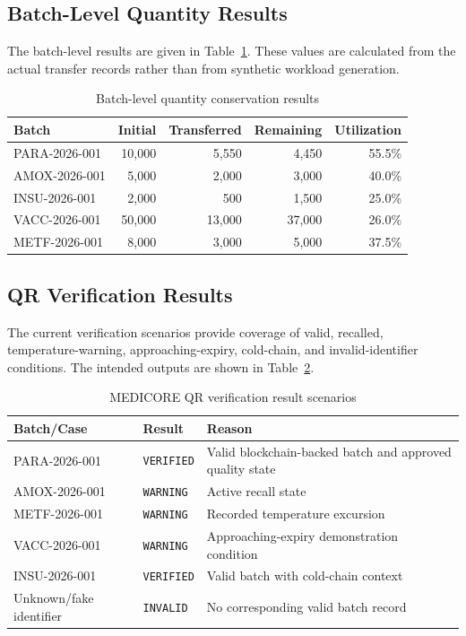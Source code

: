 \documentclass[11pt,a4paper]{article}
\begin{document}
\subsection{Batch-Level Quantity Results}
The batch-level results are given in Table~\ref{tab:batch_quantity_results}. These values are calculated from the actual transfer records rather than from synthetic workload generation.

\begin{table}[htbp]
\centering
\caption{Batch-level quantity conservation results}
\label{tab:batch_quantity_results}
\vspace{0.5em}
\begin{tabular}{lrrrr}
\toprule
\textbf{Batch} & \textbf{Initial} & \textbf{Transferred} & \textbf{Remaining} & \textbf{Utilization} \\
\midrule
PARA-2026-001 & 10,000 & 5,550 & 4,450 & 55.5\% \\
AMOX-2026-001 & 5,000 & 2,000 & 3,000 & 40.0\% \\
INSU-2026-001 & 2,000 & 500 & 1,500 & 25.0\% \\
VACC-2026-001 & 50,000 & 13,000 & 37,000 & 26.0\% \\
METF-2026-001 & 8,000 & 3,000 & 5,000 & 37.5\% \\
\bottomrule
\end{tabular}
\end{table}

\subsection{QR Verification Results}
The current verification scenarios provide coverage of valid, recalled, temperature-warning, approaching-expiry, cold-chain, and invalid-identifier conditions. The intended outputs are shown in Table~\ref{tab:qr_results}.

\begin{table}[htbp]
\centering
\caption{MEDICORE QR verification result scenarios}
\label{tab:qr_results}
\vspace{0.5em}
\begin{tabularx}{\textwidth}{lll}
\toprule
\textbf{Batch/Case} & \textbf{Result} & \textbf{Reason} \\
\midrule
PARA-2026-001 & \texttt{VERIFIED} & Valid blockchain-backed batch and approved quality state \\
AMOX-2026-001 & \texttt{WARNING} & Active recall state \\
METF-2026-001 & \texttt{WARNING} & Recorded temperature excursion \\
VACC-2026-001 & \texttt{WARNING} & Approaching-expiry demonstration condition \\
INSU-2026-001 & \texttt{VERIFIED} & Valid batch with cold-chain context \\
Unknown/fake identifier & \texttt{INVALID} & No corresponding valid batch record \\
\bottomrule
\end{tabularx}
\end{table}
\end{document}
